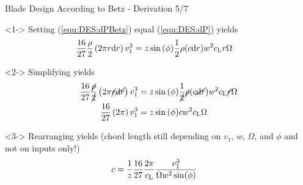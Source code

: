 \begin{frame}{Blade Design According to Betz - Derivation 5/7} 
	\begin{block}<1->{}
		Setting (\ref{equ:DES:dPBetz}) equal (\ref{equ:DES:dP}) yields
		\begin{align*}
			\frac{16}{27} \frac{\rho}{2} \left( 2\pi r \textnormal{d}r \right) v_1^3 & = z \sin{(\phi)} \frac{1}{2} \rho ( c \textnormal{d} r ) w^2 c_{\textnormal{L}} r \Omega 
		\end{align*}		
	\end{block}		
	\begin{block}<2->{}
		Simplifying yields
		\begin{align*}			
			\frac{16}{27} \frac{\cancel{\rho}}{\cancel{2}} \left( 2\pi \cancel{r} \cancel{\textnormal{d}r} \right) v_1^3 & = z \sin{(\phi)} \frac{1}{\cancel{2}} \cancel{\rho} ( c \cancel{\textnormal{d}r} ) w^2 c_{\textnormal{L}}\cancel{r} \Omega \\
			\frac{16}{27}  \left( 2\pi \right) v_1^3 & = z \sin{(\phi)}  c   w^2 c_{\textnormal{L}} \Omega
		\end{align*}			
	\end{block}	
	\begin{block}<3->{}
		Rearranging yields (chord length still depending on $v_1$, $w$, $\Omega$, and $\phi$ and not on inputs only!)
		\begin{align}			
			c   & = \frac{1}{z} \frac{16}{27} \frac{2\pi}{c_{\textnormal{L}}} \frac{v_1^3}{\Omega w^2 \sin(\phi)} \label{equ:DES:c}
		\end{align}			
	\end{block}	
\end{frame}
